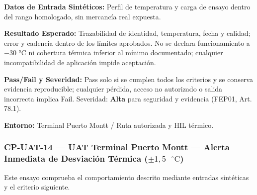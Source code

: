 \par\noindent\textbf{Datos de Entrada Sintéticos:} Perfil de temperatura y carga de ensayo dentro del rango homologado, sin mercancía real expuesta.\par
\par\noindent\textbf{Resultado Esperado:} Trazabilidad de identidad, temperatura, fecha y calidad; error y cadencia dentro de los límites aprobados. No se declara funcionamiento a −30 °C ni cobertura térmica inferior al mínimo documentado; cualquier incompatibilidad de aplicación impide aceptación.\par
\par\noindent\textbf{Pass/Fail y Severidad:} Pass solo si se cumplen todos los criterios y se conserva evidencia reproducible; cualquier pérdida, acceso no autorizado o salida incorrecta implica Fail. Severidad: \textbf{Alta} para seguridad y evidencia (FEP01, Art. 78.1).\par
\par\noindent\textbf{Entorno:} Terminal Puerto Montt / Ruta autorizada y HIL térmico.\par


\subsubsection*{CP-UAT-14 — UAT Terminal Puerto Montt — Alerta Inmediata de Desviación Térmica (\(\pm 1{,}5\text{ }^\circ\text{C}\))}\label{sec:9-cp-uat-14}

Este ensayo comprueba el comportamiento descrito mediante entradas sintéticas y el criterio siguiente.


